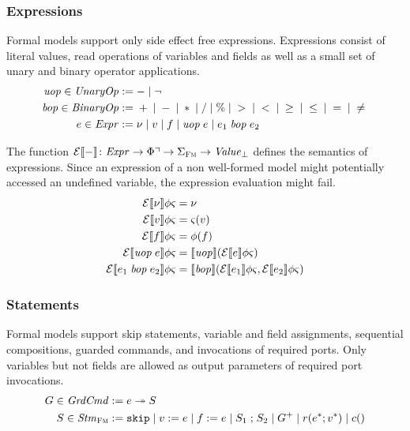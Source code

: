 \documentclass[a4paper,10pt,english]{article}
\begin{document}
\subsubsection{Expressions}
Formal models support only side effect free expressions. Expressions consist of literal values, read operations of variables
and fields as well as a small set of unary and binary operator applications.
\begin{align*}
	\mathit{uop} \in \mathit{UnaryOp} & := - \mid \neg
	\\
    \mathit{bop} \in \mathit{BinaryOp} & := {} + {} \mid {} - {} \mid {} \ast {} \mid {} / {}
                       \mid {} \% {} \mid {} > {} \mid {} < {} \mid {} \geq {} 
                       \mid {} \leq {} \mid {} = {} \mid {} \neq {}
	\\
	e \in \mathit{Expr} & := 
		\nu \mid
		v \mid
		f \mid 
		\mathit{uop}\; e \mid
		e_1 \;\mathit{bop}\; e_2
\end{align*}

The function $\mathcal{E} \llbracket - \rrbracket \colon \mathit{Expr} \rightarrow \Phi\urcorner \rightarrow \Sigma_\textsc{Fm} \rightarrow \mathit{Value}_\bot$ defines the
semantics of expressions. Since an expression of a non well-formed model might potentially accessed an undefined variable, the expression
evaluation might fail. 
\begin{align*}
	\mathcal{E} \llbracket \nu \rrbracket \phi \varsigma &= \nu \\
	\mathcal{E} \llbracket v \rrbracket \phi \varsigma &= \varsigma(v) \\
	\mathcal{E} \llbracket f \rrbracket \phi \varsigma &= \phi(f) \\
	\mathcal{E} \llbracket \mathit{uop}\; e \rrbracket \phi \varsigma &= \llbracket \mathit{uop} \rrbracket (\mathcal{E} \llbracket e \rrbracket \phi
	\varsigma) \\
	\mathcal{E} \llbracket e_1 \;\mathit{bop}\; e_2 \rrbracket \phi \varsigma &= \llbracket \mathit{bop} \rrbracket
	(\mathcal{E} \llbracket e_1 \rrbracket \phi \varsigma, \mathcal{E} \llbracket e_2 \rrbracket \phi \varsigma)
\end{align*}

\subsubsection{Statements}
Formal models support skip statements, variable and field assignments, sequential compositions, guarded commands, and
invocations of required ports. Only variables but not fields are allowed as output parameters of required port invocations.
\begin{align*}
	G \in \mathit{GrdCmd} &:= e \; \mathtt{\twoheadrightarrow} \; S \\
	S \in \mathit{Stm}_\textsc{Fm} &:=
		\mathtt{skip} \mid 
		v\; \mathtt{:=}\; e \mid
		f\; \mathtt{:=}\; e \mid
		S_1 \; \mathtt{;} \; S_2 \mid
		G^+ \mid
		r (e^*; v^*) \mid
		c ()
\end{align*}
\end{document}
